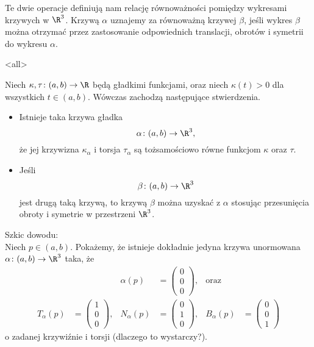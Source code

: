 \begin{frame}[<+->]

\begin{uwaga}
Te dwie operacje definiują nam relację równoważności pomiędzy wykresami krzywych w $\R^3$. Krzywą $\alpha$ uznajemy za równoważną krzywej $\beta$, jeśli wykres $\beta$ można otrzymać przez zastosowanie odpowiednich translacji, obrotów i symetrii do wykresu $\alpha$.
\end{uwaga}

\end{frame}
\mode<all>{}
\begin{frame}[<+->]
\begin{twierdzenie}[Klasyfikacyjne]
Niech $\kappa, \tau\colon (a,b)\to \R$ będą gładkimi funkcjami, oraz niech $\kappa(t)>0$ dla wszystkich $t\in (a,b)$. Wówczas zachodzą następujące stwierdzenia.
\begin{itemize}
\item Istnieje taka krzywa gładka \[\alpha\colon(a,b)\to\R^3,\] że jej krzywizna $\kappa_\alpha$ i torsja $\tau_\alpha$ są tożsamościowo równe funkcjom $\kappa$ oraz $\tau$. 
\item Jeśli \[\beta\colon (a,b)\to \R^3\] jest drugą taką krzywą, to krzywą $\beta$ można uzyskać z $\alpha$ stosując przesunięcia obroty i symetrie w przestrzeni $\R^3$.
\end{itemize}

\end{twierdzenie}

\end{frame}
\begin{frame}[<+->]

\textcolor{ared}{Szkic dowodu:}\pause\\
Niech $p\in (a,b)$. Pokażemy, że istnieje dokładnie jedyna krzywa unormowana $\alpha\colon(a,b)\to \R^3$ taka, że 
\pause\begin{align*}
&&\alpha(p)&=
\left(\!\!\begin{array}{c}
0\\0\\0
\end{array}\!\!\right)\!,&\text{oraz}\\
T_\alpha(p)&=\left(\!\!\begin{array}{c}
1\\0\\0
\end{array}\!\!\right)\!,& 
N_\alpha(p)&=\left(\!\!\begin{array}{c}
0\\1\\0
\end{array}\!\!\right)\!,& 
B_\alpha(p)&=\left(\!\!\begin{array}{c}
0\\0\\1
\end{array}\!\!\right)
\label{eqn:warunek_poczatkowy}
\end{align*}
o zadanej krzywiźnie i torsji (dlaczego to wystarczy?).

\end{frame}
